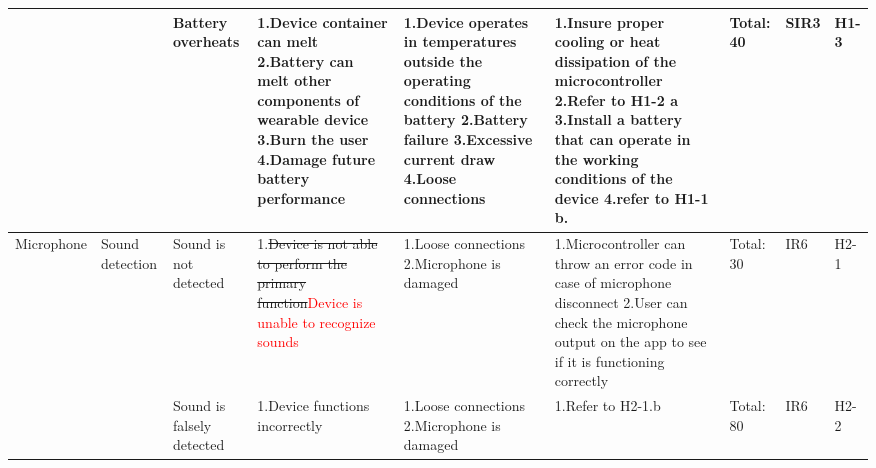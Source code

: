 \documentclass{article}
\begin{document}
\begin{landscape}
\begin{table}[H]
\begin{tabular}{| p{} | p{}  | p{} | p{} | p{} | p{} | p{} | p{} | p{} |}
     & & Battery overheats & 1.Device container can melt \newline 2.Battery can melt other components of wearable device \newline 3.Burn the user \newline 4.Damage future battery performance & 1.Device operates in temperatures outside the operating conditions of the battery \newline 2.Battery failure \newline 3.Excessive current draw \newline 4.Loose connections  & 1.Insure proper cooling or heat dissipation of the microcontroller \newline 2.Refer to H1-2 a \newline 3.Install a battery that can operate in the working conditions of the device \newline 4.refer to H1-1 b. & Total: 40 & SIR3 & H1-3 \\ \hline

     Microphone & Sound detection & Sound is not detected & 1.\sout{Device is not able to perform the primary function}\textcolor{red}{Device is unable to recognize sounds}  & 1.Loose connections \newline 2.Microphone is damaged  & 1.Microcontroller can throw an error code in case of microphone disconnect \newline 2.User can check the microphone output on the app to see if it is functioning correctly & Total: 30  & IR6  & H2-1 \\ \cline{3-9}

     & & Sound is falsely detected & 1.Device functions incorrectly & 1.Loose connections \newline 2.Microphone is damaged & 1.Refer to H2-1.b & Total: 80 & IR6 & H2-2 \\ \hline


\end{tabular}
\end{table}
\end{landscape}
\end{document}
